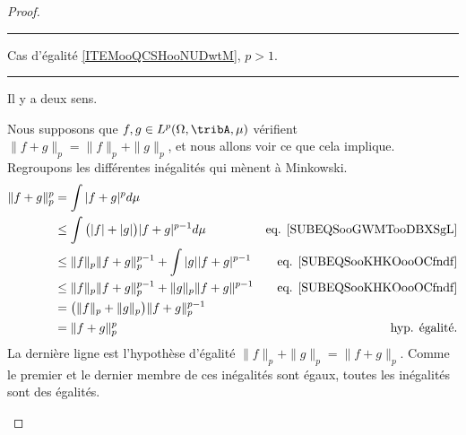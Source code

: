 \begin{proof}
	\begin{center}
		\noindent\rule{2cm}{0.4pt}
		Cas d'égalité \ref{ITEMooQCSHooNUDwtM}, $p>1$.
		\noindent\rule{2cm}{0.4pt}
	\end{center}

	Il y a deux sens.
	\begin{subproof}


		Nous supposons que \( f,g\in L^p(\Omega,\tribA,\mu)\) vérifient $\| f+g \|_p=\| f \|_p+\| g \|_p$, et nous allons voir ce que cela implique. Regroupons les différentes inégalités qui mènent à Minkowski.
		\begin{subequations}
			\begin{align}
				\| f+g \|^p_p & =\int| f+g |^pd\mu                                                                                                            \\
				              & \leq \int\big( | f |+| g | \big)| f+g |^{p-1}d\mu        & \text{eq. \eqref{SUBEQSooGWMTooDBXSgL}}\label{SUBEQooXPMYooJBKwZH} \\
				              & \leq \| f \|_p\| f+g \|_p^{p-1}+\int | g || f+g |^{p-1}  & \text{eq. \eqref{SUBEQSooKHKOooOCfndf}}\label{SUBEQooUPPAooIleVbN} \\
				              & \leq \| f \|_p\| f+g \|_p^{p-1}+\| g \|_p\| f+g \|^{p-1} & \text{eq. \eqref{SUBEQSooKHKOooOCfndf}}                            \\
				              & = \big( \| f \|_p+\| g \|_p \big)\| f+g \|_p^{p-1}                                                                            \\
				              & = \| f+g \|_p^p                                          & \text{hyp. égalité.}
			\end{align}
		\end{subequations}
		La dernière ligne est l'hypothèse d'égalité \( \| f \|_p+\| g \|_p=\| f+g \|_p\). Comme le premier et le dernier membre de ces inégalités sont égaux, toutes les inégalités sont des égalités.




\end{subproof}
\end{proof}
